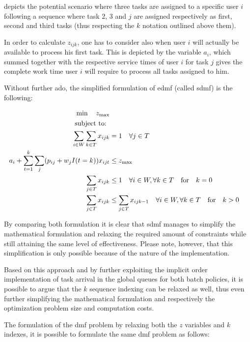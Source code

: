 \documentclass[draft=false]{seal_thesis}
\begin{document}
 depicts the potential scenario where three tasks are assigned to a specific user $i$ following a sequence where task 2, 3 and $j$ are assigned respectively as first, second and third tasks (thus respecting the $k$ notation outlined above them).

In order to calculate $z_{ijk}$, one has to consider also when user $i$ will actually be available to process his first task. This is depicted by the variable $a_i$, which summed together with the respective service times of user $i$ for task $j$ gives the complete work time user $i$ will require to process all tasks assigned to him.


Without further ado, the simplified formulation of \gls{edmf} (called \gls{sdmf}) is the following:

\begin{align}
    \min \quad z_{\text{max}}\\
    \text{subject to: } \notag \\
    \sum_{i \in W} \sum_{k \in T} x_{ijk} &= 1 \quad \forall j \in T\\
    a_i + \sum_{t=1}^k \sum_j (p_{ij} + w_j I(t=k))x_{ijt} &\leq z_{\text{max}}\\
    \sum_{j \in T} x_{ijk} &\leq 1 \quad \forall i \in W, \forall k \in T \quad \text{for} \quad k=0\\
    \sum_{j \in T} x_{ijk} &\leq \sum_{j \in T} x_{ijk-1} \quad \forall i \in W, \forall k \in T \quad \text{for} \quad k>0
\end{align}

By comparing both formulation it is clear that \gls{sdmf} manages to simplify the mathematical formulation and relaxing the required amount of constraints while still attaining the same level of effectiveness. Please note, however, that this simplification is only possible because of the nature of the implementation.

Based on this approach and by further exploiting the implicit order implementation of task arrival in the global queues for both batch policies, it is possible to argue that the $k$ sequence indexing can be relaxed as well, thus even further simplifying the mathematical formulation and respectively the optimization problem size and computation costs.

The formulation of the \gls{dmf} problem by relaxing both the $z$ variables and $k$ indexes, it is possible to formulate the same \gls{dmf} problem as follows:
\end{document}
